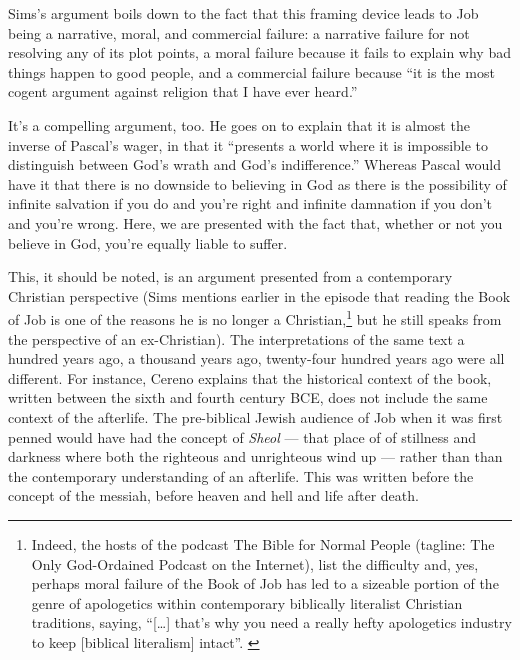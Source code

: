 Sims's argument boils down to the fact that this framing device leads to Job being a narrative, moral, and commercial failure: a narrative failure for not resolving any of its plot points, a moral failure because it fails to explain why bad things happen to good people, and a commercial failure because ``it is the most cogent argument against religion that I have ever heard.''

It's a compelling argument, too. He goes on to explain that it is almost the inverse of Pascal's wager, in that it ``presents a world where it is impossible to distinguish between God's wrath and God's indifference.'' Whereas Pascal would have it that there is no downside to believing in God as there is the possibility of infinite salvation if you do and you're right and infinite damnation if you don't and you're wrong. Here, we are presented with the fact that, whether or not you believe in God, you're equally liable to suffer.

This, it should be noted, is an argument presented from a contemporary Christian perspective (Sims mentions earlier in the episode that reading the Book of Job is one of the reasons he is no longer a Christian,\footnote{Indeed, the hosts of the podcast The Bible for Normal People (tagline: The Only God-Ordained Podcast on the Internet), list the difficulty and, yes, perhaps moral failure of the Book of Job has led to a sizeable portion of the genre of apologetics within contemporary biblically literalist Christian traditions, saying, ``{[}\ldots{]} that's why you need a really hefty apologetics industry to keep {[}biblical literalism{]} intact''. \parencite{b4np}} but he still speaks from the perspective of an ex-Christian). The interpretations of the same text a hundred years ago, a thousand years ago, twenty-four hundred years ago were all different. For instance, Cereno explains that the historical context of the book, written between the sixth and fourth century BCE, does not include the same context of the afterlife. The pre-biblical Jewish audience of Job when it was first penned would have had the concept of \emph{Sheol} --- that place of of stillness and darkness where both the righteous and unrighteous wind up --- rather than than the contemporary understanding of an afterlife. This was written before the concept of the messiah, before heaven and hell and life after death.

